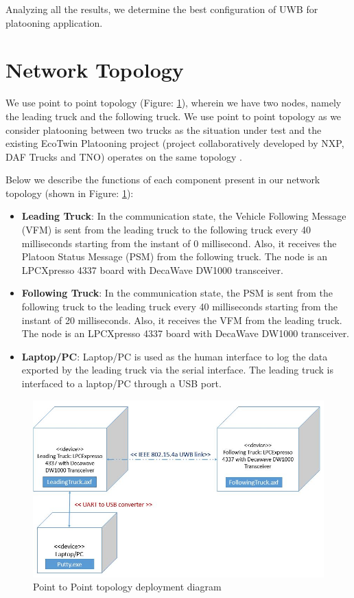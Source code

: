Analyzing all the results, we determine the best configuration of UWB for platooning application.

\section{Network Topology}
We use point to point topology (Figure: \ref{fig:NetworkTopology}), wherein we have two nodes, namely the leading truck and the following truck. We use point to point topology as we consider platooning between two trucks as the situation under test and the existing EcoTwin Platooning project (project collaboratively developed by NXP, DAF Trucks and TNO) operates on the same topology \cite{euTPC}.

Below we describe the functions of each component present in our network topology (shown in Figure: \ref{fig:NetworkTopology}):

\begin{itemize}
    \item \textbf{Leading Truck}: In the communication state, the Vehicle Following Message (VFM) is sent from the leading truck to the following truck every 40 milliseconds starting from the instant of 0 millisecond. Also, it receives the Platoon Status Message (PSM) from the following truck. The node is an LPCXpresso 4337 board with DecaWave DW1000 transceiver.
    \item \textbf{Following Truck}: In the communication state, the PSM is sent from the following truck to the leading truck every 40 milliseconds starting from the instant of 20 milliseconds. Also, it receives the VFM from the leading truck. The node is an LPCXpresso 4337 board with DecaWave DW1000 transceiver.
    \item \textbf{Laptop/PC}: Laptop/PC is used as the human interface to log the data exported by the leading truck via the serial interface. The leading truck is interfaced to a laptop/PC through a USB port.
\end{itemize}

\begin{figure}[h!]
    \includegraphics[width=1\textwidth]{figures/networkTopologyDeployment.JPG}
    \centering
    \caption{Point to Point topology deployment diagram}
    \label{fig:NetworkTopology}    
\end{figure}

